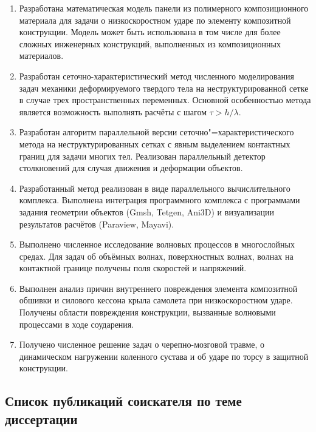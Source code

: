 \begin{enumerate}

\item Разработана математическая модель панели из полимерного композиционного материала для задачи о низкоскоростном ударе по элементу композитной конструкции. Модель может быть использована в том числе для более сложных инженерных конструкций, выполненных из композиционных материалов.

\item Разработан сеточно-характеристический метод численного моделирования задач механики деформируемого твердого тела на неструктурированной сетке в случае трех пространственных переменных. Основной особенностью метода является возможность выполнять расчёты с шагом $\tau > h / \lambda$.

\item Разработан алгоритм параллельной версии сеточно"=характеристического метода на неструктурированных сетках с явным выделением контактных границ для задачи многих тел. Реализован параллельный детектор столкновений для случая движения и деформации объектов.

\item Разработанный метод реализован в виде параллельного вычислительного комплекса. Выполнена интеграция программного комплекса с программами задания геометрии объектов (Gmsh, Tetgen, Ani3D) и визуализации результатов расчётов (Paraview, Mayavi).

\item Выполнено численное исследование волновых процессов в многослойных средах. Для задач об объёмных волнах, поверхностных волнах, волнах на контактной границе получены поля скоростей и напряжений.

\item Выполнен анализ причин внутреннего повреждения элемента композитной обшивки и силового кессона крыла самолета при низкоскоростном ударе. Получены области повреждения конструкции, вызванные волновыми процессами в ходе соударения.

\item Получено численное решение задач о черепно-мозговой травме, о динамическом нагружении коленного сустава и об ударе по торсу в защитной конструкции.

\end{enumerate}


\subsection*{Список публикаций соискателя по теме диссертации}

